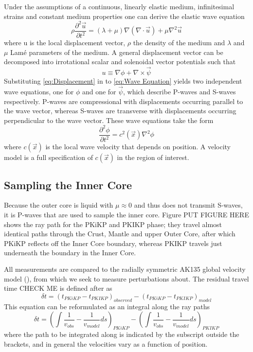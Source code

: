 \documentclass[11pt,a4paper]{article}
\begin{document}
Under the assumptions of a continuous, linearly elastic medium, infinitesimal strains and constant medium properties one can derive the elastic wave equation
\begin{equation}
	\rho \frac{\partial^{2} \vec{u}}{\partial t^{2}} = \left ( \lambda + \mu \right ) \nabla \left ( \nabla \cdot \vec{u} \right ) + \mu \nabla^{2} \vec{u}
	\label{eq:Wave Equation}
\end{equation}
where u is the local displacement vector, $\rho$ the density of the medium and $\lambda$ and $\mu$  Lam\'{e} parameters of the medium. A general displacement vector can be decomposed into irrotational scalar and solenoidal vector potentials such that
\begin{equation}
	u \equiv \nabla \phi + \nabla \times \vec{\psi}
	\label{eq:Displacement}
\end{equation}
Substituting \eqref{eq:Displacement} in to \eqref{eq:Wave Equation} yields two independent wave equations, one for $\phi$ and one for $\vec{\psi}$, which describe P-waves and S-waves respectively. P-waves are compressional with displacements occurring parallel to the wave vector, whereas S-waves are transverse with displacements occurring perpendicular to the wave vector. These wave equations take the form
\begin{equation}
	\frac{\partial^{2} \phi}{\partial t^{2}} = c^{2} \left ( \vec{x} \right ) \nabla^{2} \phi
\end{equation}
where $c(\vec{x})$ is the local wave velocity that depends on position. A velocity model is a full specification of $c(\vec{x})$ in the region of interest.

\subsection{Sampling the Inner Core}
Because the outer core is liquid with $\mu \approx 0$ and thus does not transmit S-waves, it is P-waves that are used to sample the inner core. Figure PUT FIGURE HERE shows the ray path for the PKiKP and PKIKP phase; they travel almost identical paths through the Crust, Mantle and upper Outer Core, after which PKiKP reflects off the Inner Core boundary, whereas PKIKP travels just underneath the boundary in the Inner Core.

All measurements are compared to the radially symmetric AK135 global velocity model (\cite{Kennett1995b}), from which we seek to measure perturbations about. The residual travel time CHECK ME is defined after \cite{Waszek2011a} as
\begin{equation}
	\delta t = \left ( t_{PKiKP} - t_{PKIKP} \right )_{observed} -  \left ( t_{PKiKP} - t_{PKIKP} \right )_{model}
\end{equation}
This equation can be reformulated as an integral along the ray paths
\begin{equation}
		\delta t = \left (  \int \frac{1}{v_{obs}} - \frac{1}{v_{model}} ds  \right )_{PKiKP} - \left (  \int \frac{1}{v_{obs}} - \frac{1}{v_{model}} ds \right )_{PKIKP}
		\label{eq:deltat}
\end{equation}
where the path to be integrated along is indicated by the subscript outside the brackets, and in general the velocities vary as a function of position.
\end{document}
